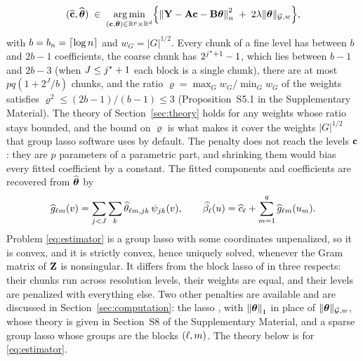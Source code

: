 \begin{equation}
  \label{eq:estimator}
  (\widehat{\mathbf{c}},\widehat{\boldsymbol{\theta}}) \;\in\; \mathop{\rm arg\,min}_{(\mathbf{c},\boldsymbol{\theta})\in
  \mathbb{R}^{p}\times\mathbb{R}^{d}}
  \Bigl\{\left\lVert \mathbf{Y} - \mathbf{A}\mathbf{c} - \mathbf{B}\boldsymbol{\theta} \right\rVert_{n}^{2}
  \;+\; 2\lambda\lVert \boldsymbol{\theta}\rVert_{\mathcal{G},w}\Bigr\} ,
\end{equation}
with $b = b_{n} = \lceil\log n\rceil$ and $w_{G} = |G|^{1/2}$. Every chunk of a
fine level has between $b$ and $2b-1$ coefficients, the coarse chunk has
$2^{j^{*}+1}-1$, which lies between $b-1$ and $2b-3$ (when $J \le j^{*}+1$
each block is a single chunk), there are at most
$pq(1+2^{J}/b)$ chunks, and the ratio $\varrho = \max_{G}w_{G}/\min_{G}w_{G}$
of the weights satisfies $\varrho^{2} \le (2b-1)/(b-1) \le 3$
(Proposition~S5.1 in the Supplementary Material). The theory of
Section~\ref{sec:theory} holds for any weights whose ratio stays bounded, and
the bound on $\varrho$ is what makes it cover the weights $|G|^{1/2}$ that
group lasso software uses by default.
The penalty does not reach the levels $\mathbf{c}$: they are $p$ parameters of a
parametric part, and shrinking them would bias every fitted coefficient by a
constant. The fitted components and coefficients are recovered from
$\widehat{\boldsymbol{\theta}}$ by
\[
  \widehat{g}_{\ell m}(v) = \sum_{j<J}\sum_{k}
  \widehat{\theta}_{\ell m,jk}\,\psi_{jk}(v),
  \qquad
  \widehat{\beta_{\ell}}(u) = \widehat{c}_{\ell}
  + \sum_{m=1}^{q}\widehat{g}_{\ell m}(u_{m}).
\]
Problem \eqref{eq:estimator} is a  group lasso \citep{Yuan-Lin-2006} with some coordinates unpenalized, so
it is convex, and it is strictly convex, hence uniquely solved, whenever the
Gram matrix of $\mathbf{Z}$ is nonsingular.  It differs from the block lasso of
\citet{Klopp-Pensky-2015} in three respects: their chunks run across resolution
levels, their weights are equal, and their levels are penalized with everything
else. Two other penalties are available and are discussed in
Section~\ref{sec:computation}: the lasso \citep{tibshirani1996regression}, with
$\left\lVert \boldsymbol{\theta} \right\rVert_{1}$ in place of $\lVert \boldsymbol{\theta}\rVert_{\mathcal{G},w}$, whose theory is given in
Section~S8 of the Supplementary Material, and a sparse group lasso
\citep{Simon-Friedman-Hastie-Tibshirani-2013} whose groups are the blocks
$(\ell,m)$. The theory below is for \eqref{eq:estimator}.

